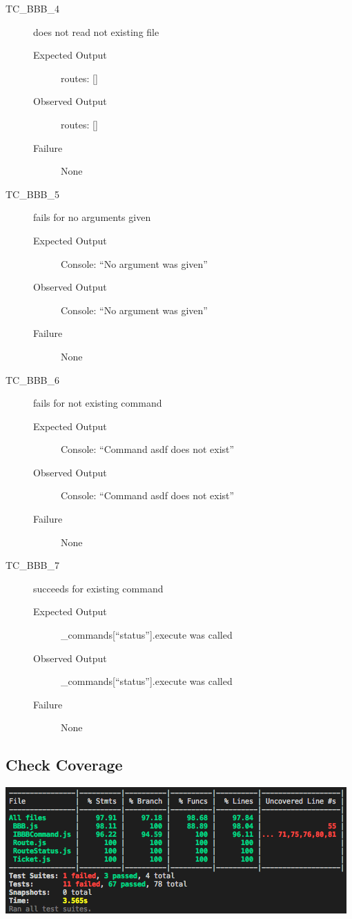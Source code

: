 \documentclass[11pt]{article}
\begin{document}
\begin{description}
\item[{TC\_BBB\_4}] does not read not existing file
\begin{description}
\item[{Expected Output}] routes: []
\item[{Observed Output}] routes: []
\item[{Failure}] None
\end{description}

\item[{TC\_BBB\_5}] fails for no arguments given
\begin{description}
\item[{Expected Output}] Console: “No argument was given”
\item[{Observed Output}] Console: “No argument was given”
\item[{Failure}] None
\end{description}

\item[{TC\_BBB\_6}] fails for not existing command
\begin{description}
\item[{Expected Output}] Console: “Command asdf does not exist”
\item[{Observed Output}] Console: “Command asdf does not exist”
\item[{Failure}] None
\end{description}

\item[{TC\_BBB\_7}] succeeds for existing command
\begin{description}
\item[{Expected Output}] \_commands[“status”].execute was called
\item[{Observed Output}] \_commands[“status”].execute was called
\item[{Failure}] None
\end{description}
\end{description}

\subsection{Check Coverage}
\label{sec:org191e763}

\begin{center}
\includegraphics[width=.9\linewidth]{documentation.org.img/Iteration2_Coverage.png}
\end{center}
\end{document}
